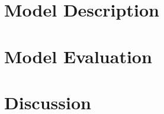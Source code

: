 \section{Model Description}
\label{sec:gcd-model-desc}

\section{Model Evaluation}
\label{sec:gcd-model-eval}

\section{Discussion}
\label{sec[gcd-disc]}

